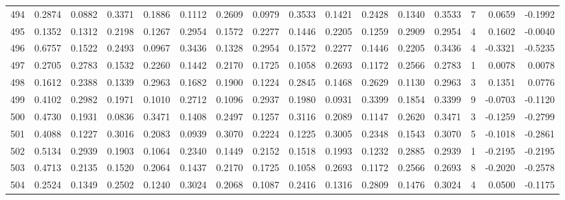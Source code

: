 \begin{tabular}{lrrrrrrrrrrrrrrr}
494 &      0.2874 &  0.0882 &  0.3371 &  0.1886 &  0.1112 &  0.2609 &  0.0979 &  0.3533 &  0.1421 &  0.2428 &   0.1340 &     0.3533 &      7 &                    0.0659 &                    -0.1992 \\
495 &      0.1352 &  0.1312 &  0.2198 &  0.1267 &  0.2954 &  0.1572 &  0.2277 &  0.1446 &  0.2205 &  0.1259 &   0.2909 &     0.2954 &      4 &                    0.1602 &                    -0.0040 \\
496 &      0.6757 &  0.1522 &  0.2493 &  0.0967 &  0.3436 &  0.1328 &  0.2954 &  0.1572 &  0.2277 &  0.1446 &   0.2205 &     0.3436 &      4 &                   -0.3321 &                    -0.5235 \\
497 &      0.2705 &  0.2783 &  0.1532 &  0.2260 &  0.1442 &  0.2170 &  0.1725 &  0.1058 &  0.2693 &  0.1172 &   0.2566 &     0.2783 &      1 &                    0.0078 &                     0.0078 \\
498 &      0.1612 &  0.2388 &  0.1339 &  0.2963 &  0.1682 &  0.1900 &  0.1224 &  0.2845 &  0.1468 &  0.2629 &   0.1130 &     0.2963 &      3 &                    0.1351 &                     0.0776 \\
499 &      0.4102 &  0.2982 &  0.1971 &  0.1010 &  0.2712 &  0.1096 &  0.2937 &  0.1980 &  0.0931 &  0.3399 &   0.1854 &     0.3399 &      9 &                   -0.0703 &                    -0.1120 \\
500 &      0.4730 &  0.1931 &  0.0836 &  0.3471 &  0.1408 &  0.2497 &  0.1257 &  0.3116 &  0.2089 &  0.1147 &   0.2620 &     0.3471 &      3 &                   -0.1259 &                    -0.2799 \\
501 &      0.4088 &  0.1227 &  0.3016 &  0.2083 &  0.0939 &  0.3070 &  0.2224 &  0.1225 &  0.3005 &  0.2348 &   0.1543 &     0.3070 &      5 &                   -0.1018 &                    -0.2861 \\
502 &      0.5134 &  0.2939 &  0.1903 &  0.1064 &  0.2340 &  0.1449 &  0.2152 &  0.1518 &  0.1993 &  0.1232 &   0.2885 &     0.2939 &      1 &                   -0.2195 &                    -0.2195 \\
503 &      0.4713 &  0.2135 &  0.1520 &  0.2064 &  0.1437 &  0.2170 &  0.1725 &  0.1058 &  0.2693 &  0.1172 &   0.2566 &     0.2693 &      8 &                   -0.2020 &                    -0.2578 \\
504 &      0.2524 &  0.1349 &  0.2502 &  0.1240 &  0.3024 &  0.2068 &  0.1087 &  0.2416 &  0.1316 &  0.2809 &   0.1476 &     0.3024 &      4 &                    0.0500 &                    -0.1175 \\

\end{tabular}
